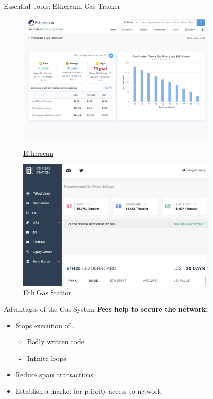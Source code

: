 \documentclass[handout]{beamer}
\begin{document}
\begin{frame}{Essential Tools: Ethereum Gas Tracker}
	\begin{figure}
	\centering
	\begin{minipage}{.45\textwidth}
  		\centering
  		\includegraphics[width=0.9\textwidth]{../assets/images/Etherscan.png}
  		\caption*{\footnotesize \href{https://etherscan.io/}{\link Etherscan}}
	\end{minipage}
	\begin{minipage}{.45\textwidth}
  		\centering
  		\includegraphics[width=0.9\textwidth]{../assets/images/ethGasStation.png}
  		\caption*{\footnotesize \href{https://www.Ethgasstation.info}{\link Eth Gas Station}}
	\end{minipage}
	\end{figure}
\end{frame}

\begin{frame}{Advantages of the Gas System}
	\textbf{Fees help to secure the network:}
	\begin{itemize}
		\item Stops execution of…
		\begin{itemize}
			\item Badly written code
			\item Infinite loops
		\end{itemize}
		\item Reduce spam transactions
		\item Establish a market for priority access to network
	\end{itemize}
\end{frame}	
\end{document}
